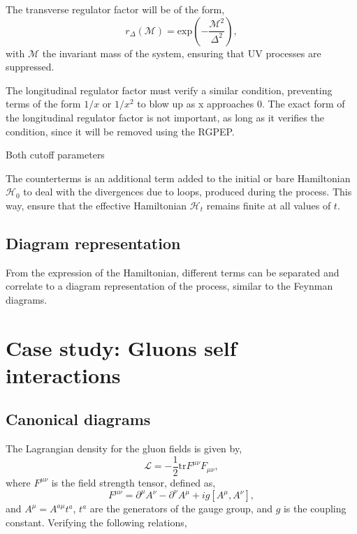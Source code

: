 \documentclass[11pt,a4paper,twoside,pdf]{article}
\numberwithin{equation}{section}
\begin{document}
The transverse regulator factor will be of the form, 
\begin{equation}
    r_\Delta (\mathcal{M}) = \text{exp} \left( -\frac{\mathcal{M}^2}{\Delta^2} \right),
\end{equation}
with $\mathcal{M}$ the invariant mass of the system, ensuring that UV processes are
suppressed.

The longitudinal regulator factor must verify a similar condition, preventing terms
of the form $1/x$ or $1/x^2$ to blow up as x approaches 0. The exact form of the 
longitudinal regulator factor is not important, as long as it verifies the condition, 
since it will be removed using the RGPEP.

Both cutoff parameters 






The counterterms is an additional term added to the initial or bare Hamiltonian 
$\mathcal{H}_0$ to deal with the divergences due to loops, produced during the 
process. This way, ensure that the effective Hamiltonian $\mathcal{H}_t$ remains 
finite at all values of $t$.

\subsection{Diagram representation}

From the expression of the Hamiltonian, different terms can be separated and correlate
to a diagram representation of the process, similar to the Feynman diagrams.


\section{Case study: Gluons self interactions} \label{sec:cases}

\subsection{Canonical diagrams}

The Lagrangian density for the gluon fields is given by,
\begin{equation}
    \mathcal{L} = -\frac{1}{2}\text{tr}F^{\mu\nu}F_{\mu\nu},
\end{equation}
where $F^{\mu\nu}$ is the field strength tensor, defined as,
\begin{equation}
    F^{\mu\nu} = \partial^\mu A^\nu - \partial^\nu A^\mu + ig [A^\mu, A^\nu],
\end{equation}
and $A^\mu = A^{a\mu}t^a$, $t^a$ are the generators of the gauge group, and $g$ is the
coupling constant. Verifying the following relations,
\end{document}
